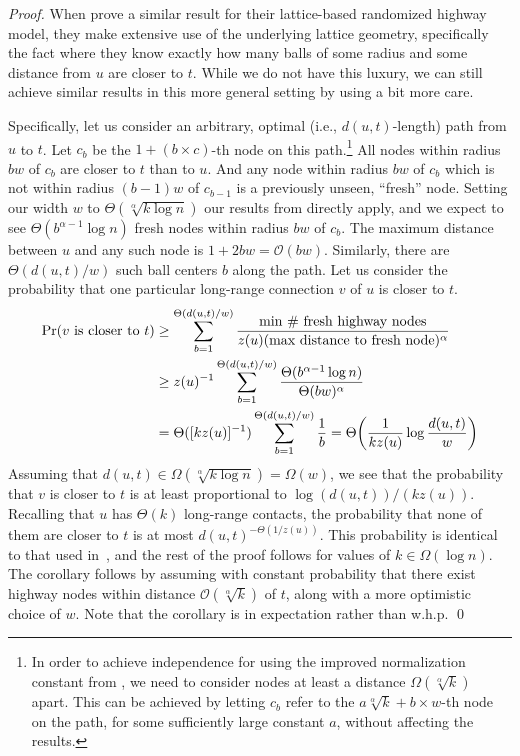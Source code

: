 \begin{proof}
	When \cite{gila2023highway} prove a similar result for their lattice-based
	randomized highway model, they make extensive use of the underlying lattice
	geometry, specifically the fact where they know exactly how many balls of
	some radius and some distance from $u$ are closer to $t$.
	While we do not have this luxury, we can still achieve similar results in
	this more general setting by using a bit more care.
	
	Specifically, let us consider an arbitrary, optimal (i.e., $d(u, t)$-length) path from $u$ to
	$t$.
	Let $c_b$ be the $1 + (b \times c)$-th node on this path.\footnote{In order to
	achieve independence for using the improved normalization constant from
	, we need to consider nodes at least a distance
	$\Omega(\sqrt[\alpha]{k})$ apart. This can be achieved by letting $c_b$
	refer to the $a \sqrt[\alpha]{k} + b \times w$-th node on the path,
	for some sufficiently large constant $a$, without affecting the results.}
	All nodes within radius $b w$ of $c_b$ are closer to $t$ than to $u$.
	And any node within radius $b w$ of $c_b$ which is not within radius $(b -
	1)w$ of $c_{b - 1}$ is a previously unseen, ``fresh'' node.
	Setting our width $w$ to $\Theta(\sqrt[\alpha]{k \log{n}})$ our results from
	 directly apply, and we expect to see $\Theta(b^{\alpha -
	1} \log{n})$ fresh nodes within radius $b w$ of $c_b$.
	The maximum distance between $u$ and any such node is $1 + 2 bw =
	\mathcal{O}(bw)$.
	Similarly, there are $\Theta(d(u, t)/w)$ such ball centers $b$ along the
	path.
	Let us consider the probability that one particular long-range connection 
	$v$ of $u$ is closer to $t$.
	\begin{align*}
		\Pr(v \text{ is closer to } t) &\geq \sum_{b = 1}^{\Theta(d(u, t)/w)}{\frac{\text{min \# fresh highway nodes}}{z(u) (\text{max distance to fresh node})^\alpha}} \\
		&\geq z(u)^{-1} \sum_{b = 1}^{\Theta(d(u, t)/w)}{\frac{\Theta(b^{\alpha - 1} \log{n})}{\Theta(b w)^\alpha}} \\
		&= \Theta([k z(u)]^{-1}) \sum_{b = 1}^{\Theta(d(u, t)/w)}{\frac{1}{b}} = \Theta\pars*{\frac{1}{k z(u)} \log{\frac{d(u, t)}{w}}}
	\end{align*}
	Assuming that $d(u, t) \in \Omega(\sqrt[\alpha]{k \log{n}}) = \Omega(w)$, we
	see that the probability that $v$ is closer to $t$ is at least proportional
	to $\log(d(u, t))/(k z(u))$.
	Recalling that $u$ has $\Theta(k)$ long-range contacts, the
	probability that none of them are closer to $t$ is at most
	$d(u, t)^{-\Theta(1/z(u))}$.
	This probability is identical to that used in~\cite{gila2023highway}, and
	the rest of the proof follows for values of $k \in \Omega(\log{n})$.
	The corollary follows by assuming with constant probability that there exist
	highway nodes within distance $\mathcal{O}(\sqrt[\alpha]{k})$ of $t$, along
	with a more optimistic choice of $w$.
	Note that the corollary is in expectation rather than w.h.p.
	\qed
\end{proof}

